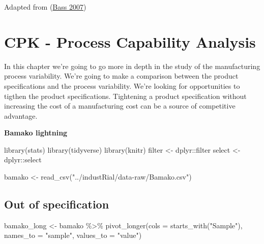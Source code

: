\documentclass[
]{book}
\newenvironment{Shaded}{\begin{snugshade}}{\end{snugshade}}
\newcommand{\AttributeTok}[1]{\textcolor[rgb]{0.77,0.63,0.00}{#1}}
\newcommand{\FunctionTok}[1]{\textcolor[rgb]{0.00,0.00,0.00}{#1}}
\newcommand{\NormalTok}[1]{#1}
\newcommand{\OtherTok}[1]{\textcolor[rgb]{0.56,0.35,0.01}{#1}}
\newcommand{\SpecialCharTok}[1]{\textcolor[rgb]{0.00,0.00,0.00}{#1}}
\newcommand{\StringTok}[1]{\textcolor[rgb]{0.31,0.60,0.02}{#1}}
\begin{document}
Adapted from (\protect\hyperlink{ref-Bass2007}{Bass 2007})

\hypertarget{Cpk}{%
\chapter{CPK - Process Capability Analysis}\label{Cpk}}

In this chapter we're going to go more in depth in the study of the manufacturing process variability. We're going to make a comparison between the product specifications and the process variability. We're looking for opportunities to tigthen the product specifications.
Tightening a product specification without increasing the cost of a manufacturing cost can be a source of competitive advantage.

\textbf{Bamako lightning}

\begin{Shaded}
\begin{Highlighting}[]
\FunctionTok{library}\NormalTok{(stats)}
\FunctionTok{library}\NormalTok{(tidyverse)}
\FunctionTok{library}\NormalTok{(knitr)}
\NormalTok{filter }\OtherTok{\textless{}{-}}\NormalTok{ dplyr}\SpecialCharTok{::}\NormalTok{filter}
\NormalTok{select }\OtherTok{\textless{}{-}}\NormalTok{ dplyr}\SpecialCharTok{::}\NormalTok{select}
\end{Highlighting}
\end{Shaded}

\begin{Shaded}
\begin{Highlighting}[]
\NormalTok{bamako }\OtherTok{\textless{}{-}} \FunctionTok{read\_csv}\NormalTok{(}\StringTok{"../industRial/data{-}raw/Bamako.csv"}\NormalTok{)}
\end{Highlighting}
\end{Shaded}

\hypertarget{out-of-specification}{%
\section{Out of specification}\label{out-of-specification}}

\begin{Shaded}
\begin{Highlighting}[]
\NormalTok{bamako\_long }\OtherTok{\textless{}{-}}\NormalTok{ bamako }\SpecialCharTok{\%\textgreater{}\%}
  \FunctionTok{pivot\_longer}\NormalTok{(}\AttributeTok{cols =} \FunctionTok{starts\_with}\NormalTok{(}\StringTok{"Sample"}\NormalTok{),}
               \AttributeTok{names\_to =} \StringTok{"sample"}\NormalTok{,}
               \AttributeTok{values\_to =} \StringTok{"value"}\NormalTok{)}
\end{Highlighting}
\end{Shaded}
\end{document}
